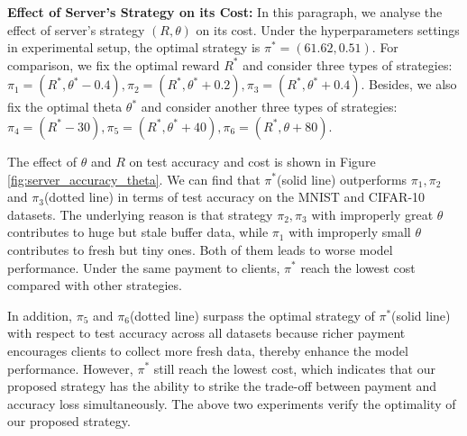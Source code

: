 \documentclass{article}
\theoremstyle{plain}
\theoremstyle{definition}
\theoremstyle{remark}
\begin{document}
\textbf{Effect of Server's Strategy on its Cost: }
In this paragraph, we analyse the effect of server's strategy $(R, \theta)$ on its cost.
Under the hyperparameters settings in experimental setup, the optimal strategy is $\pi^* = (61.62, 0.51)$.
For comparison, we fix the optimal reward $R^*$ and consider three types of strategies: $\pi_1=(R^*, \theta^*-0.4), \pi_2=(R^*, \theta^*+0.2), \pi_3=(R^*, \theta^*+0.4)$.
Besides, we also fix the optimal theta $\theta^*$ and consider another three types of strategies: $\pi_4=(R^* - 30), \pi_5=(R^*, \theta^*+40), \pi_6=(R^*, \theta+80)$.

The effect of $\theta$ and $R$ on test accuracy and cost is shown in Figure \ref{fig:server_accuracy_theta}.
We can find that $\pi^*$(solid line) outperforms $\pi_1, \pi_2$ and $\pi_3$(dotted line) in terms of test accuracy on the MNIST and CIFAR-10 datasets. The underlying reason is that strategy $\pi_2, \pi_3$ with improperly great $\theta$ contributes to huge but stale buffer data, while $\pi_1$ with improperly small $\theta$ contributes to fresh but tiny ones. Both of them leads to worse model performance.
Under the same payment to clients, $\pi^*$ reach the lowest cost compared with other strategies.

In addition, $\pi_5$ and $\pi_6$(dotted line) surpass the optimal strategy of $\pi^*$(solid line) with respect to test accuracy across all datasets because richer payment encourages clients to collect more fresh data, thereby enhance the model performance.
However, $\pi^*$ still reach the lowest cost, which indicates that our proposed strategy has the ability to strike the trade-off between payment and accuracy loss simultaneously.
The above two experiments verify the optimality of our proposed strategy.
\end{document}
